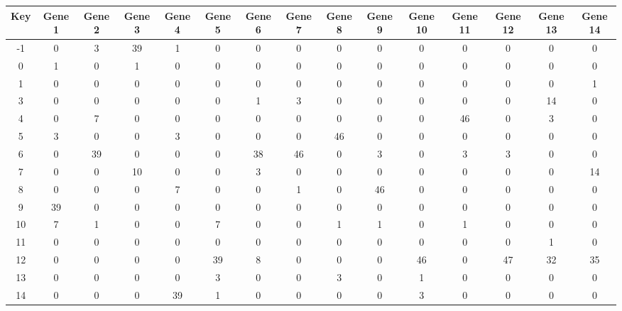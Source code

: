 \begin{tabular}{|c|c|c|c|c|c|c|c|c|c|c|c|c|c|c|}
\hline
Key & Gene 1 & Gene 2 & Gene 3 & Gene 4 & Gene 5 & Gene 6 & Gene 7 & Gene 8 & Gene 9 & Gene 10 & Gene 11 & Gene 12 & Gene 13 & Gene 14 \\
\hline
-1 & 0 & 3 & 39 & 1 & 0 & 0 & 0 & 0 & 0 & 0 & 0 & 0 & 0 & 0 \\
0 & 1 & 0 & 1 & 0 & 0 & 0 & 0 & 0 & 0 & 0 & 0 & 0 & 0 & 0 \\
1 & 0 & 0 & 0 & 0 & 0 & 0 & 0 & 0 & 0 & 0 & 0 & 0 & 0 & 1 \\
3 & 0 & 0 & 0 & 0 & 0 & 1 & 3 & 0 & 0 & 0 & 0 & 0 & 14 & 0 \\
4 & 0 & 7 & 0 & 0 & 0 & 0 & 0 & 0 & 0 & 0 & 46 & 0 & 3 & 0 \\
5 & 3 & 0 & 0 & 3 & 0 & 0 & 0 & 46 & 0 & 0 & 0 & 0 & 0 & 0 \\
6 & 0 & 39 & 0 & 0 & 0 & 38 & 46 & 0 & 3 & 0 & 3 & 3 & 0 & 0 \\
7 & 0 & 0 & 10 & 0 & 0 & 3 & 0 & 0 & 0 & 0 & 0 & 0 & 0 & 14 \\
8 & 0 & 0 & 0 & 7 & 0 & 0 & 1 & 0 & 46 & 0 & 0 & 0 & 0 & 0 \\
9 & 39 & 0 & 0 & 0 & 0 & 0 & 0 & 0 & 0 & 0 & 0 & 0 & 0 & 0 \\
10 & 7 & 1 & 0 & 0 & 7 & 0 & 0 & 1 & 1 & 0 & 1 & 0 & 0 & 0 \\
11 & 0 & 0 & 0 & 0 & 0 & 0 & 0 & 0 & 0 & 0 & 0 & 0 & 1 & 0 \\
12 & 0 & 0 & 0 & 0 & 39 & 8 & 0 & 0 & 0 & 46 & 0 & 47 & 32 & 35 \\
13 & 0 & 0 & 0 & 0 & 3 & 0 & 0 & 3 & 0 & 1 & 0 & 0 & 0 & 0 \\
14 & 0 & 0 & 0 & 39 & 1 & 0 & 0 & 0 & 0 & 3 & 0 & 0 & 0 & 0 \\
\hline
\end{tabular}